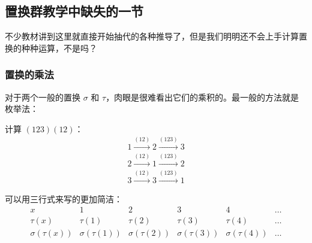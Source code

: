 \subsection{置换群教学中缺失的一节}

不少教材讲到这里就直接开始抽代的各种推导了，但是我们明明还不会上手计算置换的种种运算，不是吗？

\subsubsection{置换的乘法}

对于两个一般的置换 \(\sigma\) 和 \(\tau\)，肉眼是很难看出它们的乘积的。最一般的方法就是枚举法：
\begin{example}
    计算 \((123)(12)\)：
    \begin{align*}
        1 \xrightarrow{(12)} 2 \xrightarrow{(123)} 3 \\
        2 \xrightarrow{(12)} 1 \xrightarrow{(123)} 2 \\
        3 \xrightarrow{(12)} 3 \xrightarrow{(123)} 1
    \end{align*}
\end{example}
可以用三行式来写的更加简洁：
\[
    \begin{array}{c|ccccc}
        x & 1 & 2 & 3 & 4 & \dots \\
        \hline
        \tau(x) & \tau(1) & \tau(2) & \tau(3) & \tau(4) & \dots \\
        \sigma(\tau(x)) & \sigma(\tau(1)) & \sigma(\tau(2)) & \sigma(\tau(3)) & \sigma(\tau(4)) & \dots
\end{array}\]

